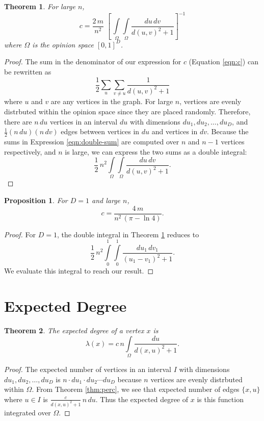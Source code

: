 \documentclass[a4paper,10pt]{article}
\newtheorem{prop}{Proposition}
\newtheorem{theorem}{Theorem}
\begin{document}
\begin{theorem}
\label{thm:c}
For large $n$,
 \begin{equation}
  c = \frac{2\, m}{n^2} \; \left[\,\int\limits_\Omega \int\limits_\Omega \frac{du\, dv}{d(u, v)^2 + 1}\right]^{-1}
 \end{equation}
where $\Omega$ is the opinion space $[0, 1]^D$.
\end{theorem}
\begin{proof}
 The sum in the denominator of our expression for $c$ (Equation \ref{eqn:c}) can be rewritten as
 \begin{equation}
 \label{eqn:double-sum}
  \frac{1}{2} \sum\limits_{u}\sum\limits_{v \neq u} \frac{1}{d(u, v)^2 + 1}
 \end{equation}
 where $u$ and $v$ are any vertices in the graph. For large $n$, vertices are evenly distrbuted within the opinion space since they are placed randomly. Therefore, there are $n \,du$ vertices in an interval $du$ with dimensions $du_1, du_2, \ldots, du_D$, and $\frac{1}{2}(n\, du)(n\, dv)$ edges between vertices in $du$ and vertices in $dv$. Because the sums in Expression \ref{eqn:double-sum} are computed over $n$ and $n - 1$ vertices respectively, and $n$ is large, we can express the two sums as a double integral:
 \begin{equation}
  \frac{1}{2}\, n^2 \int\limits_\Omega \int\limits_\Omega \frac{du \, dv}{d(u, v)^2 + 1}.
 \end{equation}
\end{proof}
\begin{prop}
 For $D=1$ and large $n$,
 \begin{equation*}
  c = \frac{4 \,m}{n^2 \,(\pi - \ln 4)}.
 \end{equation*}
\end{prop}
\begin{proof}
For $D=1$, the double integral in Theorem \ref{thm:c} reduces to
 \begin{equation}
  \frac{1}{2}\, n^2 \int\limits_0^1 \int\limits_0^1 \frac{du_1 \, dv_1}{(u_1 - v_1)^2 + 1}.
 \end{equation}
We evaluate this integral to reach our result.
\end{proof}

\section{Expected Degree}
\begin{theorem}
\label{thm:lambdax}
The expected degree of a vertex $x$ is
 \begin{equation}
 \lambda(x) = c\,n\int\limits_\Omega \frac{du}{d(x, u)^2 + 1}.
\end{equation}
\end{theorem}
\begin{proof}
The expected number of vertices in an interval $I$ with dimensions $du_1, du_2, \ldots, du_D$  is $n \cdot du_1 \cdot du_2 \cdots du_D$ because $n$ vertices are evenly distrbuted within $\Omega$. From Theorem \ref{thm:perc}, we see that expected number of edges $\{x, u\}$ where $u \in I$ is $\frac{c}{d(x, u)^2 + 1} \, n \, du$. Thus the expected degree of $x$ is this function integrated over $\Omega$.
\end{proof}
\end{document}
